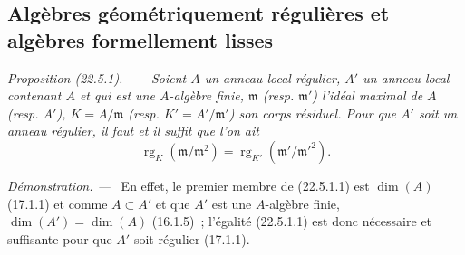 \documentclass[10pt,oneside]{book}
\makeatletter
\newcommand{\setmanualcurrentlabel}[1]{\def\@currentlabel{#1}}
\newenvironment{proposition}[1][]{%
  \setmanualcurrentlabel{#1}\par\medskip\noindent\itshape Proposition (#1). ---\ }{\par}
\newenvironment{proof}{%
  \par\medskip\noindent\textit{Démonstration. ---\ }}{\par}
\makeatother
\begin{document}
\subsection{Algèbres géométriquement régulières et algèbres formellement lisses}
\label{subsection:0.22.5-fr}

\begin{proposition}[22.5.1]
\label{0.22.5.1-fr}
Soient $A$ un anneau local régulier, $A'$ un anneau local contenant $A$ et qui
est une $A$-algèbre finie, $\mathfrak m$ (resp. $\mathfrak m'$) l'idéal maximal
de $A$ (resp. $A'$), $K=A/\mathfrak m$ (resp. $K'=A'/\mathfrak m'$) son corps
résiduel. Pour que $A'$ soit un anneau régulier, il faut et il suffit que l'on
ait
\begin{equation}
\label{0.22.5.1.1-fr}
  \operatorname{rg}_K(\mathfrak m/\mathfrak m^2)
  =\operatorname{rg}_{K'}(\mathfrak m'/\mathfrak m'^2).
  \tag{22.5.1.1}
\end{equation}
\end{proposition}

\begin{proof}
En effet, le premier membre de (22.5.1.1) est $\dim(A)$ (17.1.1) et comme
$A\subset A'$ et que $A'$ est une $A$-algèbre finie,
$\dim(A')=\dim(A)$ (16.1.5)~; l'égalité (22.5.1.1) est donc nécessaire et
suffisante pour que $A'$ soit régulier (17.1.1).
\end{proof}
\end{document}
